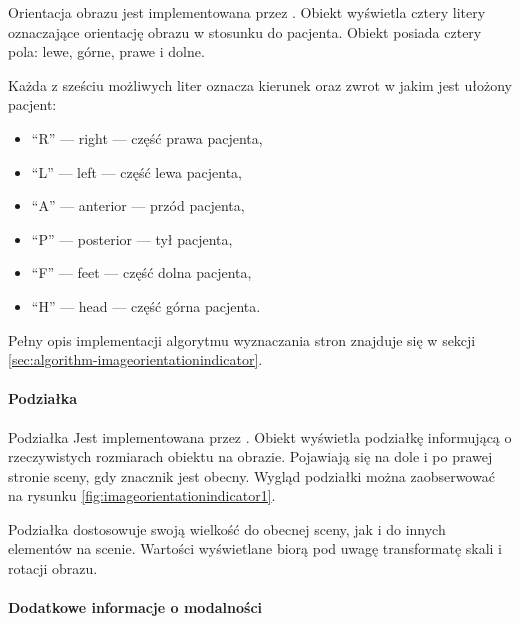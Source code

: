 \par
Orientacja obrazu jest implementowana przez .
Obiekt wyświetla cztery litery oznaczające orientację obrazu w stosunku do pacjenta.
Obiekt posiada cztery pola: lewe, górne, prawe i dolne.

\par
Każda z sześciu możliwych liter oznacza kierunek oraz zwrot w jakim jest ułożony pacjent:
\begin{itemize}
    \item \enquote{R} --- right --- część prawa pacjenta,
    \item \enquote{L} --- left --- część lewa pacjenta,
    \item \enquote{A} --- anterior --- przód pacjenta,
    \item \enquote{P} --- posterior --- tył pacjenta,
    \item \enquote{F} --- feet --- część dolna pacjenta,
    \item \enquote{H} --- head --- część górna pacjenta.
\end{itemize}

\par
Pełny opis implementacji algorytmu wyznaczania stron znajduje się w sekcji \ref{sec:algorithm-imageorientationindicator}.

\paragraph{Podziałka}

Podziałka Jest implementowana przez .
Obiekt wyświetla podziałkę informującą o rzeczywistych rozmiarach obiektu na obrazie.
Pojawiają się na dole i po prawej stronie sceny, gdy znacznik  jest obecny.
Wygląd podziałki można zaobserwować na rysunku \ref{fig:imageorientationindicator1}.

Podziałka dostosowuje swoją wielkość do obecnej sceny, jak i do innych elementów na scenie.
Wartości wyświetlane biorą pod uwagę transformatę skali i rotacji obrazu.

\paragraph{Dodatkowe informacje o modalności}

